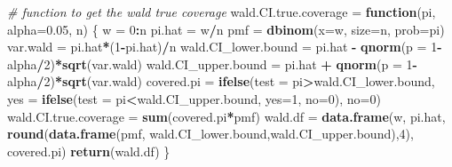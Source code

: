 \documentclass[]{article}
\newenvironment{Shaded}{\begin{snugshade}}{\end{snugshade}}
\newcommand{\CommentTok}[1]{\textcolor[rgb]{0.56,0.35,0.01}{\textit{#1}}}
\newcommand{\ControlFlowTok}[1]{\textcolor[rgb]{0.13,0.29,0.53}{\textbf{#1}}}
\newcommand{\DataTypeTok}[1]{\textcolor[rgb]{0.13,0.29,0.53}{#1}}
\newcommand{\DecValTok}[1]{\textcolor[rgb]{0.00,0.00,0.81}{#1}}
\newcommand{\FloatTok}[1]{\textcolor[rgb]{0.00,0.00,0.81}{#1}}
\newcommand{\KeywordTok}[1]{\textcolor[rgb]{0.13,0.29,0.53}{\textbf{#1}}}
\newcommand{\NormalTok}[1]{#1}
\newcommand{\OperatorTok}[1]{\textcolor[rgb]{0.81,0.36,0.00}{\textbf{#1}}}
\newcommand{\StringTok}[1]{\textcolor[rgb]{0.31,0.60,0.02}{#1}}
\begin{document}
\begin{Shaded}
\begin{Highlighting}[]
\CommentTok{# function to get the wald true coverage }
\NormalTok{wald.CI.true.coverage =}\StringTok{ }\ControlFlowTok{function}\NormalTok{(pi, }\DataTypeTok{alpha=}\FloatTok{0.05}\NormalTok{, n) \{  }
\NormalTok{  w =}\StringTok{ }\DecValTok{0}\OperatorTok{:}\NormalTok{n}
\NormalTok{  pi.hat =}\StringTok{ }\NormalTok{w}\OperatorTok{/}\NormalTok{n}
\NormalTok{  pmf =}\StringTok{ }\KeywordTok{dbinom}\NormalTok{(}\DataTypeTok{x=}\NormalTok{w, }\DataTypeTok{size=}\NormalTok{n, }\DataTypeTok{prob=}\NormalTok{pi)  }
\NormalTok{  var.wald =}\StringTok{ }\NormalTok{pi.hat}\OperatorTok{*}\NormalTok{(}\DecValTok{1}\OperatorTok{-}\NormalTok{pi.hat)}\OperatorTok{/}\NormalTok{n}
\NormalTok{  wald.CI_lower.bound =}\StringTok{ }\NormalTok{pi.hat }\OperatorTok{-}\StringTok{ }\KeywordTok{qnorm}\NormalTok{(}\DataTypeTok{p =} \DecValTok{1}\OperatorTok{-}\NormalTok{alpha}\OperatorTok{/}\DecValTok{2}\NormalTok{)}\OperatorTok{*}\KeywordTok{sqrt}\NormalTok{(var.wald)}
\NormalTok{  wald.CI_upper.bound =}\StringTok{ }\NormalTok{pi.hat }\OperatorTok{+}\StringTok{ }\KeywordTok{qnorm}\NormalTok{(}\DataTypeTok{p =} \DecValTok{1}\OperatorTok{-}\NormalTok{alpha}\OperatorTok{/}\DecValTok{2}\NormalTok{)}\OperatorTok{*}\KeywordTok{sqrt}\NormalTok{(var.wald)  }
\NormalTok{  covered.pi =}\StringTok{ }\KeywordTok{ifelse}\NormalTok{(}\DataTypeTok{test =}\NormalTok{ pi}\OperatorTok{>}\NormalTok{wald.CI_lower.bound, }\DataTypeTok{yes =} \KeywordTok{ifelse}\NormalTok{(}\DataTypeTok{test =}\NormalTok{ pi}\OperatorTok{<}\NormalTok{wald.CI_upper.bound, }\DataTypeTok{yes=}\DecValTok{1}\NormalTok{, }\DataTypeTok{no=}\DecValTok{0}\NormalTok{), }\DataTypeTok{no=}\DecValTok{0}\NormalTok{)  }
\NormalTok{  wald.CI.true.coverage =}\StringTok{ }\KeywordTok{sum}\NormalTok{(covered.pi}\OperatorTok{*}\NormalTok{pmf)  }
\NormalTok{  wald.df =}\StringTok{ }\KeywordTok{data.frame}\NormalTok{(w, pi.hat, }\KeywordTok{round}\NormalTok{(}\KeywordTok{data.frame}\NormalTok{(pmf, wald.CI_lower.bound,wald.CI_upper.bound),}\DecValTok{4}\NormalTok{), covered.pi)  }
  \KeywordTok{return}\NormalTok{(wald.df)}
\NormalTok{\}}


\end{Highlighting}
\end{Shaded}
\end{document}

